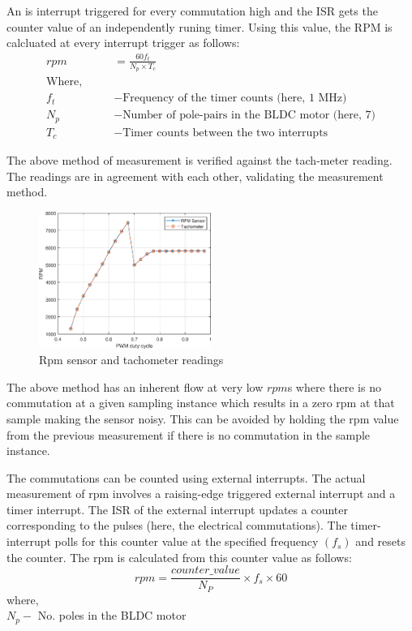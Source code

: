 An is interrupt triggered for every commutation high and the ISR gets the counter
value of an independently runing timer. Using this value, the RPM is calcluated
at every interrupt trigger as follows:
\begin{align*}
    rpm &= \frac{60 f_t}{N_p \times T_c}\\
    \text{Where,} \qquad &\\
    f_t &- \text{Frequency of the timer counts (here, $1$ MHz)}\\
    N_p &- \text{Number of pole-pairs in the BLDC motor (here, $7$)}\\
    T_c &- \text{Timer counts between the two interrupts}
\end{align*}

The above method of measurement is verified against the tach-meter reading. The
readings are in agreement with each other, validating the measurement method.
\begin{figure}[H]
    \centering
    \includegraphics[width=0.5\textwidth]{./figs/rpm_feedback/static_calib.eps}
    \caption{Rpm sensor and tachometer readings}
\end{figure}

The above method has an inherent flow at very low $rpm$s where there is no
commutation at a given sampling instance which results in a zero rpm at that
sample making the sensor noisy. This can be avoided by holding the rpm value
from the previous measurement if there is no commutation in the sample instance.

\bigskip

\par The commutations can be counted using external interrupts. The actual measurement of rpm involves a raising-edge triggered external interrupt and a timer interrupt. The ISR of the external interrupt updates a counter corresponding to the pulses (here, the electrical commutations). The timer-interrupt polls for this counter value at the specified frequency $(f_s)$ and resets the counter. The rpm is calculated from this counter value as follows:
$$rpm = \frac{counter\_value}{N_P} \times f_s \times 60$$
where, \\
$N_p - $ No. poles in the BLDC motor\\

